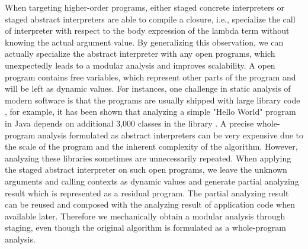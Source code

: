 \iffalse
When staging a concrete interpreter, the programmers need to distinguish 
static and dynamic values --- the given program to be executed by the 
interpreter is classified as static because it is known at compile-time, 
and the inputs to that program are dynamic.  However, when staging an 
abstract interpreter, this distinction does not exist anymore. Because the 
abstract interpreter instantiates all the inputs as some form of abstract 
values, which are usually top elements in their abstract domains and are 
also statically known. 
Then what is the point of staging if there is no such distinction?
A surprising by-product of thinking about this question is to realize that 
we can apply the staged abstract interpreter on \textit{open} programs, and
the free variables representing other parts of the program (e.g., libraries) 
are dynamic inputs, therefore we obtain a modular analysis through staging, 
mechanically. 
\note{TR: I don't understand this. The program structure is static, the abstract values are still dynamic, no? They change in every iteration of the fixpoint algorithm} 
\note{TR: why is it a big deal. On Closed programs we obtain a constant factor, but modular analysis has different asymptotics}
\fi

When targeting higher-order programs, either staged concrete interpreters or staged abstract interpreters
are able to compile a closure, i.e., specialize the call of interpreter with respect to the body
expression of the lambda term without knowing the actual argument value. By generalizing this observation,
we can actually specialize the abstract interpreter with any open programs, 
which unexpectedly leads to a modular analysis and improves scalability.
A open program contains free variables, which represent other parts of the program and will be left
as dynamic values.
For instances, one challenge in static analysis of modern software is that the programs are usually 
shipped with large library code \cite{toman_et_al:LIPIcs:2017:7121}, for example, it has been shown that 
analyzing a simple "Hello World" program in Java depends on additional 3,000 classes in the library 
\cite{DBLP:conf/oopsla/KulkarniMZN16}.
A precise whole-program analysis formulated as abstract interpreters can be very expensive
due to the scale of the program and the inherent complexity of the algorithm.
However, analyzing these libraries sometimes are unnecessarily repeated.
When applying the staged abstract interpreter on such open programs, we leave the unknown arguments and 
calling contexts as dynamic values and generate partial analyzing result which is 
represented as a residual program. The partial analyzing result can be reused and composed with the 
analyzing result of application code when available later. Therefore we mechanically obtain a modular
analysis through staging, even though the original algorithm is formulated as a whole-program analysis.


